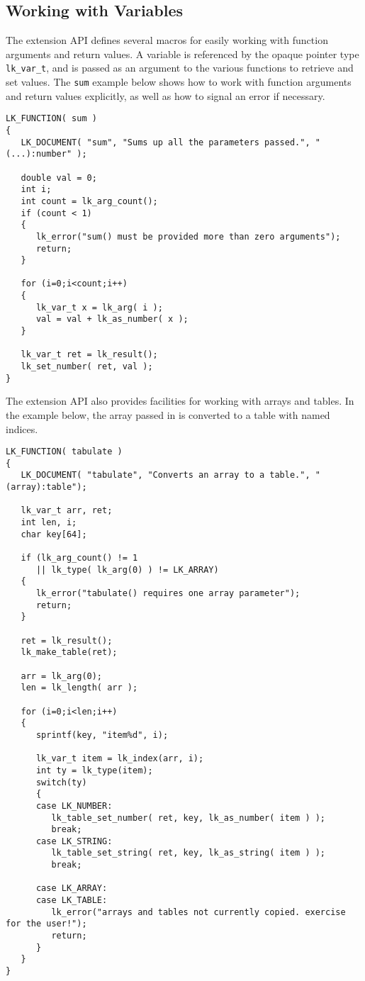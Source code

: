\documentclass{article}
\begin{document}
\subsection{Working with Variables}

The extension API defines several macros for easily working with function arguments and return values.  A variable is referenced by the opaque pointer type \texttt{lk\_var\_t}, and is passed as an argument to the various functions to retrieve and set values.  The \texttt{sum} example below shows how to work with function arguments and return values explicitly, as well as how to signal an error if necessary.

\begin{verbatim}
LK_FUNCTION( sum )
{
   LK_DOCUMENT( "sum", "Sums up all the parameters passed.", "(...):number" );

   double val = 0;
   int i;
   int count = lk_arg_count();
   if (count < 1)
   {
      lk_error("sum() must be provided more than zero arguments");
      return;
   }

   for (i=0;i<count;i++)
   {
      lk_var_t x = lk_arg( i );
      val = val + lk_as_number( x );
   }

   lk_var_t ret = lk_result();
   lk_set_number( ret, val );
}
\end{verbatim}

The extension API also provides facilities for working with arrays and tables.  In the example below, the array passed in is converted to a table with named indices.

\begin{verbatim}
LK_FUNCTION( tabulate )
{
   LK_DOCUMENT( "tabulate", "Converts an array to a table.", "(array):table");
	
   lk_var_t arr, ret;
   int len, i;
   char key[64];
	
   if (lk_arg_count() != 1
      || lk_type( lk_arg(0) ) != LK_ARRAY)
   {
      lk_error("tabulate() requires one array parameter");
      return;
   }
	
   ret = lk_result();
   lk_make_table(ret);
	
   arr = lk_arg(0);
   len = lk_length( arr );

   for (i=0;i<len;i++)
   {
      sprintf(key, "item%d", i);
		
      lk_var_t item = lk_index(arr, i);
      int ty = lk_type(item);
      switch(ty)
      {
      case LK_NUMBER:
         lk_table_set_number( ret, key, lk_as_number( item ) );
         break;
      case LK_STRING:
         lk_table_set_string( ret, key, lk_as_string( item ) );
         break;
			
      case LK_ARRAY:
      case LK_TABLE:
         lk_error("arrays and tables not currently copied. exercise for the user!");
         return;
      }
   }		
}
\end{verbatim}
\end{document}
